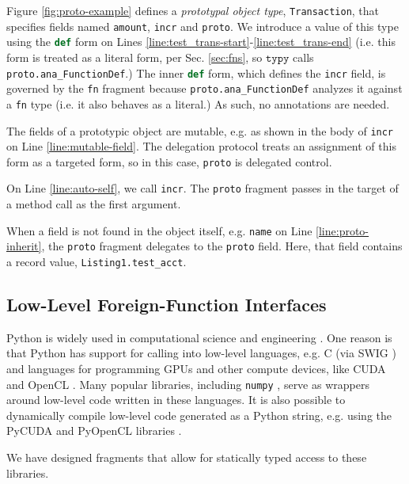 \documentclass[preprint,10pt]{sigplanconf}
\newcommand{\typy}{\texttt{typy}}
\newcommand{\lip}[1]{\lstinline[language=Python,basicstyle=\ttfamily\footnotesize,deletendkeywords={tuple,buffer,map}]{#1}}
\newcommand{\li}[1]{\lip{#1}}
\begin{document}
Figure \ref{fig:proto-example} defines a \emph{prototypal object type}, \li{Transaction}, that specifies fields named \li{amount}, \li{incr} and \li{proto}. We introduce a value of this type using the \li{def} form on Lines \ref{line:test_trans-start}-\ref{line:test_trans-end} (i.e. this form is treated as a literal form, per Sec. \ref{sec:fns}, so $\typy$ calls \li{proto.ana_FunctionDef}.) The inner \li{def} form, which defines the \li{incr} field, is governed by the \li{fn} fragment because \li{proto.ana_FunctionDef} analyzes it against a \li{fn} type (i.e. it also behaves as a literal.) As such, no annotations are needed.

The fields of a prototypic object are mutable, e.g. as shown in the body of \li{incr} on Line \ref{line:mutable-field}. The delegation protocol treats an assignment of this form as a targeted form, so in this case, \li{proto} is delegated control.

On Line \ref{line:auto-self}, we call \li{incr}. The \li{proto} fragment passes in the target of a method call as the first argument. 

When a field is not found in the object itself, e.g. \li{name} on Line \ref{line:proto-inherit}, the \li{proto} fragment delegates to the \li{proto} field. Here, that field contains a record value, \li{Listing1.test_acct}. 

\subsection{Low-Level Foreign-Function Interfaces}
Python is widely used in computational science and engineering \cite{oliphant2007python}. One reason is that Python has support for calling into low-level languages, e.g. C (via SWIG \cite{beazley2003automated}) and languages for programming GPUs and other compute devices, like CUDA and OpenCL \cite{klockner2011pycuda}. Many popular libraries, including \li{numpy} \cite{van2011numpy}, serve as wrappers around low-level code written in these languages. It is also possible to dynamically compile low-level code generated as a Python string, e.g. using the PyCUDA and PyOpenCL libraries \cite{klockner2011pycuda}.

We have designed fragments that allow for statically typed access to these libraries. 
\end{document}
